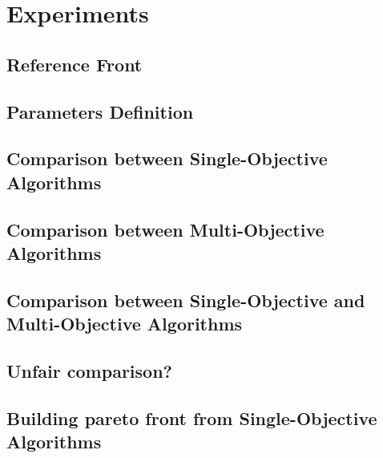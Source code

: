 \chapter{Experiments}
\label{chapter:chapter05}


\section{Reference Front}

\section{Parameters Definition}

\section{Comparison between Single-Objective Algorithms}

\section{Comparison between Multi-Objective Algorithms}

\section{Comparison between Single-Objective and Multi-Objective Algorithms}

\section{Unfair comparison?}

\section{Building pareto front from Single-Objective Algorithms}


